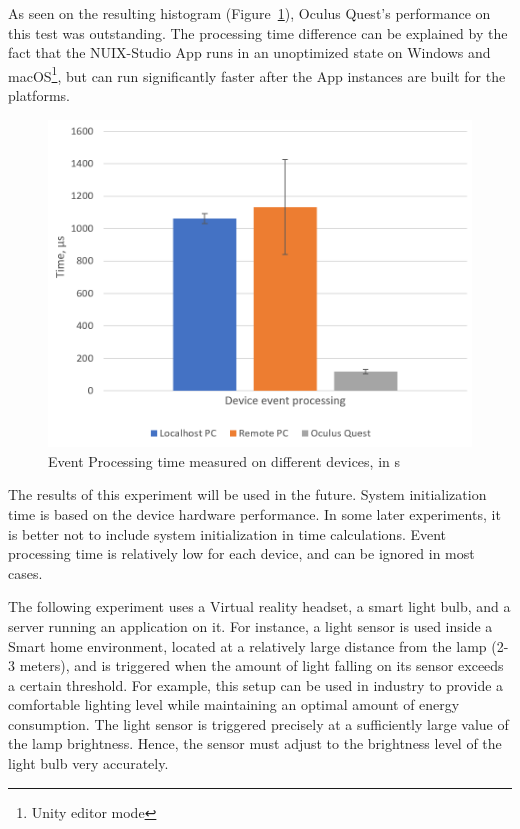 As seen on the resulting histogram (Figure~\ref{fig:EventProcessingTime-figure}), Oculus Quest's performance on this test was outstanding. The processing time difference can be explained by the fact that the NUIX-Studio App runs in an unoptimized state on Windows and macOS\footnote{Unity editor mode}, but can run significantly faster after the App instances are built for the platforms.

\begin{figure}
  \centering
  \includegraphics[width = 0.9 \linewidth]{figures/EventProcessingTime.png}
  \caption{Event Processing time measured on different devices, in \textmu{}s}
  \label{fig:EventProcessingTime-figure}
\end{figure}

The results of this experiment will be used in the future. System initialization time is based on the device hardware performance. In some later experiments, it is better not to include system initialization in time calculations. Event processing time is relatively low for each device, and can be ignored in most cases.

The following experiment uses a Virtual reality headset, a smart light bulb, and a server running an application on it. For instance, a light sensor is used inside a Smart home environment, located at a relatively large distance from the lamp (2-3 meters), and is triggered when the amount of light falling on its sensor exceeds a certain threshold. For example, this setup can be used in industry to provide a comfortable lighting level while maintaining an optimal amount of energy consumption. The light sensor is triggered precisely at a sufficiently large value of the lamp brightness. Hence, the sensor must adjust to the brightness level of the light bulb very accurately.

